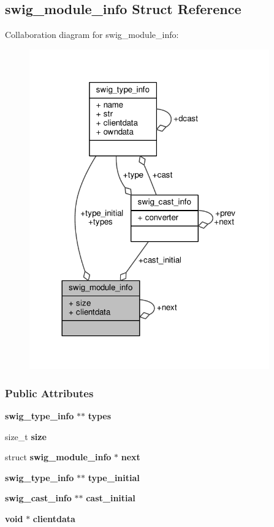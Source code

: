 \subsection{swig\+\_\+module\+\_\+info Struct Reference}
\label{structswig__module__info}


Collaboration diagram for swig\+\_\+module\+\_\+info\+:
\nopagebreak
\begin{figure}[H]
\begin{center}
\leavevmode
\includegraphics[width=293pt]{d9/dbc/structswig__module__info__coll__graph}
\end{center}
\end{figure}
\subsubsection*{Public Attributes}
\begin{DoxyCompactItemize}
\item 
{\bf swig\+\_\+type\+\_\+info} $\ast$$\ast$ {\bf types}
\item 
size\+\_\+t {\bf size}
\item 
struct {\bf swig\+\_\+module\+\_\+info} $\ast$ {\bf next}
\item 
{\bf swig\+\_\+type\+\_\+info} $\ast$$\ast$ {\bf type\+\_\+initial}
\item 
{\bf swig\+\_\+cast\+\_\+info} $\ast$$\ast$ {\bf cast\+\_\+initial}
\item 
{\bf void} $\ast$ {\bf clientdata}
\end{DoxyCompactItemize}


